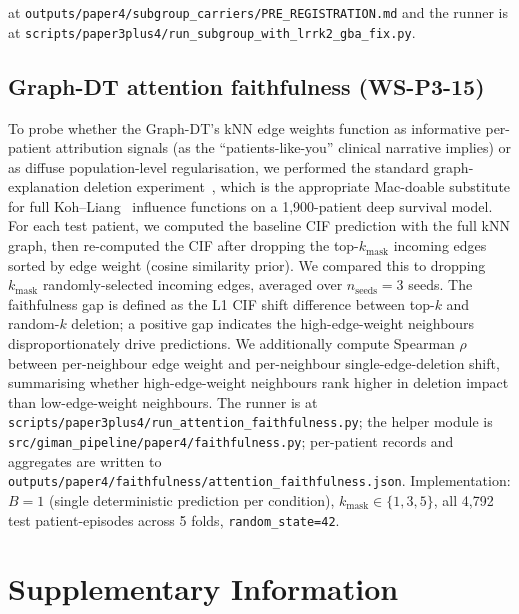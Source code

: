 \documentclass[11pt]{article}
\begin{document}
at \texttt{outputs/paper4/subgroup\_carriers/PRE\_REGISTRATION.md} and the runner is at \texttt{scripts/paper3plus4/run\_subgroup\_with\_lrrk2\_gba\_fix.py}.

\subsection*{Graph-DT attention faithfulness (WS-P3-15)}

To probe whether the Graph-DT's kNN edge weights function as informative per-patient attribution signals (as the ``patients-like-you'' clinical narrative implies) or as diffuse population-level regularisation, we performed the standard graph-explanation deletion experiment~\cite{yuan2022explainability,deyoung2020eraser}, which is the appropriate Mac-doable substitute for full Koh--Liang~\cite{kohliang2017influence} influence functions on a 1{,}900-patient deep survival model. For each test patient, we computed the baseline CIF prediction with the full kNN graph, then re-computed the CIF after dropping the top-$k_\mathrm{mask}$ incoming edges sorted by edge weight (cosine similarity prior). We compared this to dropping $k_\mathrm{mask}$ randomly-selected incoming edges, averaged over $n_\mathrm{seeds}{=}3$ seeds. The faithfulness gap is defined as the L1 CIF shift difference between top-$k$ and random-$k$ deletion; a positive gap indicates the high-edge-weight neighbours disproportionately drive predictions. We additionally compute Spearman $\rho$ between per-neighbour edge weight and per-neighbour single-edge-deletion shift, summarising whether high-edge-weight neighbours rank higher in deletion impact than low-edge-weight neighbours. The runner is at \texttt{scripts/paper3plus4/run\_attention\_faithfulness.py}; the helper module is \texttt{src/giman\_pipeline/paper4/faithfulness.py}; per-patient records and aggregates are written to \texttt{outputs/paper4/faithfulness/attention\_faithfulness.json}. Implementation: $B{=}1$ (single deterministic prediction per condition), $k_\mathrm{mask}{\in}\{1,3,5\}$, all 4{,}792 test patient-episodes across 5 folds, \texttt{random\_state=42}.

\section*{Supplementary Information}
\end{document}

